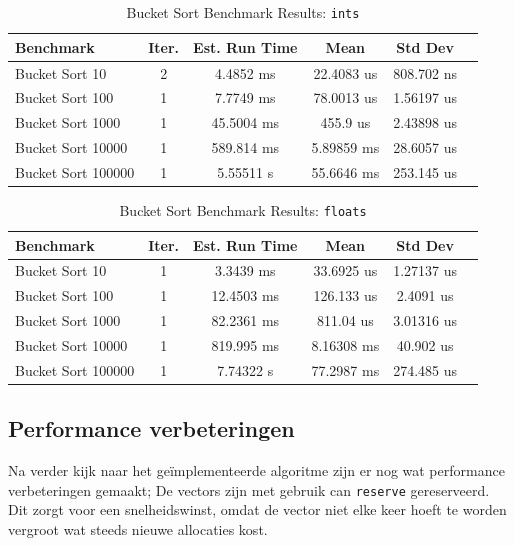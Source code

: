 \documentclass{article}
\begin{document}
\begin{table}[H]
  \caption{Bucket Sort Benchmark Results: \texttt{ints}\label{tab:ints-detailed}}
  \begin{tabular*}{\columnwidth}{@{\extracolsep\fill}lccccc}
    \hline
    Benchmark  & Iter. & Est. Run Time & Mean          & Std Dev       \\
    \hline
    Bucket Sort 10     & 2 & 4.4852 ms  & 22.4083 us  & 808.702 ns  \\
    Bucket Sort 100    & 1 & 7.7749 ms  & 78.0013 us  & 1.56197 us  \\
    Bucket Sort 1000   & 1 & 45.5004 ms & 455.9 us    & 2.43898 us  \\
    Bucket Sort 10000  & 1 & 589.814 ms & 5.89859 ms  & 28.6057 us  \\
    Bucket Sort 100000 & 1 & 5.55511 s  & 55.6646 ms  & 253.145 us  \\
    \hline
  \end{tabular*}
\end{table}

\begin{table}[H]
  \caption{Bucket Sort Benchmark Results:  \texttt{floats}\label{tab:floats-detailed}}
  \begin{tabular*}{\columnwidth}{@{\extracolsep\fill}lccccc}
    \hline
    Benchmark  & Iter. & Est. Run Time & Mean          & Std Dev       \\
    \hline
    Bucket Sort 10     & 1 & 3.3439  ms  & 33.6925 us  & 1.27137  us  \\
    Bucket Sort 100    & 1 & 12.4503 ms & 126.133  us  & 2.4091  us   \\
    Bucket Sort 1000   & 1 & 82.2361 ms & 811.04   us  & 3.01316 us  \\
    Bucket Sort 10000  & 1 & 819.995 ms & 8.16308  ms  & 40.902  us   \\
    Bucket Sort 100000 & 1 & 7.74322 s  & 77.2987  ms  & 274.485 us  \\
    \hline
  \end{tabular*}
\end{table}

\vspace{1em}
\subsection*{Performance verbeteringen}
Na verder kijk naar het geïmplementeerde algoritme zijn er nog wat performance verbeteringen gemaakt;
De vectors zijn met gebruik can \texttt{reserve} gereserveerd. Dit zorgt voor een snelheidswinst, omdat de vector niet elke keer hoeft te worden vergroot wat steeds nieuwe allocaties kost.
\end{document}
